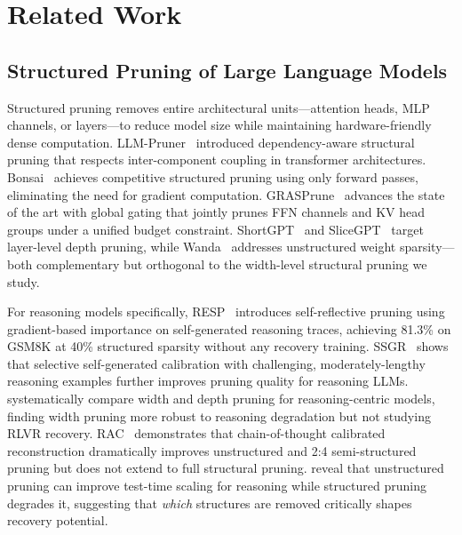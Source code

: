 \section{Related Work}
\label{sec:related}

\subsection{Structured Pruning of Large Language Models}
\label{sec:rw_pruning}

Structured pruning removes entire architectural units---attention heads, MLP channels, or layers---to reduce model size while maintaining hardware-friendly dense computation.
LLM-Pruner~\citep{llmpruner2023} introduced dependency-aware structural pruning that respects inter-component coupling in transformer architectures.
Bonsai~\citep{bonsai2025} achieves competitive structured pruning using only forward passes, eliminating the need for gradient computation.
GRASPrune~\citep{graspprune2026} advances the state of the art with global gating that jointly prunes FFN channels and KV head groups under a unified budget constraint.
ShortGPT~\citep{shortgpt2024} and SliceGPT~\citep{slicegpt2024} target layer-level depth pruning, while Wanda~\citep{wanda2024} addresses unstructured weight sparsity---both complementary but orthogonal to the width-level structural pruning we study.

For reasoning models specifically, RESP~\citep{resp2025} introduces self-reflective pruning using gradient-based importance on self-generated reasoning traces, achieving 81.3\% on GSM8K at 40\% structured sparsity without any recovery training.
SSGR~\citep{ssgr2025} shows that selective self-generated calibration with challenging, moderately-lengthy reasoning examples further improves pruning quality for reasoning LLMs.
\citet{llms2lrms2026} systematically compare width and depth pruning for reasoning-centric models, finding width pruning more robust to reasoning degradation but not studying RLVR recovery.
RAC~\citep{rac2025} demonstrates that chain-of-thought calibrated reconstruction dramatically improves unstructured and 2:4 semi-structured pruning but does not extend to full structural pruning.
\citet{doingmore2026} reveal that unstructured pruning can improve test-time scaling for reasoning while structured pruning degrades it, suggesting that \emph{which} structures are removed critically shapes recovery potential.

